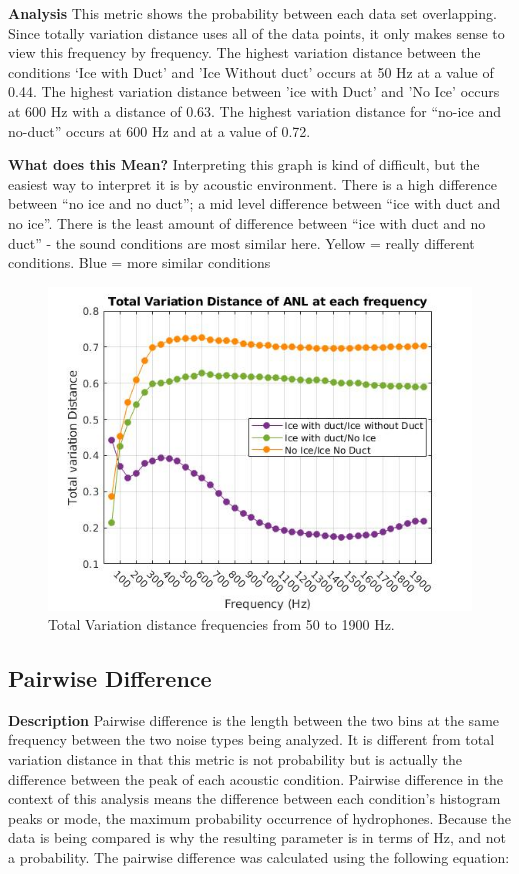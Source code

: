 \textbf{Analysis}
This metric shows the probability between each data set overlapping. Since totally variation distance uses all of the data points, it only makes sense to view this frequency by frequency. The highest variation distance between the conditions ‘Ice with Duct' and 'Ice Without duct’ occurs at 50 Hz at a value of 0.44. The highest variation distance between 'ice with Duct' and 'No Ice' occurs at 600 Hz with a distance of 0.63. The highest variation distance for “no-ice and no-duct” occurs at 600 Hz and at a value of 0.72. 

\textbf{What does this Mean?}
Interpreting this graph is kind of difficult, but the easiest way to interpret it is by acoustic environment. There is a high difference between “no ice and no duct”; a mid level difference between “ice with duct and no ice”. There is the least amount of difference between “ice with duct and no duct” - the sound conditions are most similar here.
Yellow = really different conditions. Blue = more similar conditions

\begin{figure}[H]
\centering
\includegraphics[scale=0.5]{Figures/recolor_total_var_dist_norm_pdf.jpg}
\caption{Total Variation distance frequencies from 50 to 1900 Hz.}
\label{fig_totvardist}
\end{figure}

\subsection{Pairwise Difference}
\textbf{Description}
Pairwise difference is the length between the two bins at the same frequency between the two noise types being analyzed. It is different from total variation distance in that this metric is not probability but is actually the difference between the peak of each acoustic condition. Pairwise difference in the context of this analysis means the difference between each condition's histogram peaks or mode, the maximum probability occurrence of hydrophones. Because the data is being compared  is why the resulting parameter is in terms of Hz, and not a probability.
The pairwise difference was calculated using the following equation:

